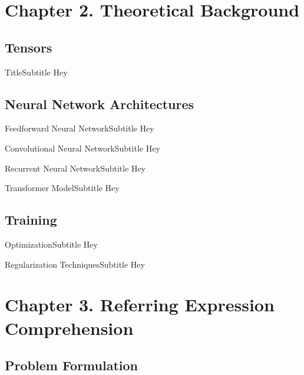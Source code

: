 \documentclass{beamer}
\begin{document}
\section{Chapter 2. Theoretical Background}

\subsection{Tensors}

\begin{frame}{Title}{Subtitle}
  Hey
\end{frame}


\subsection{Neural Network Architectures}

\begin{frame}{Feedforward Neural Network}{Subtitle}
  Hey
\end{frame}

\begin{frame}{Convolutional Neural Network}{Subtitle}
  Hey
\end{frame}

\begin{frame}{Recurrent Neural Network}{Subtitle}
  Hey
\end{frame}

\begin{frame}{Transformer Model}{Subtitle}
  Hey
\end{frame}


\subsection{Training}

\begin{frame}{Optimization}{Subtitle}
  Hey
\end{frame}

\begin{frame}{Regularization Techniques}{Subtitle}
  Hey
\end{frame}




\section{Chapter 3. Referring Expression Comprehension}

\subsection{Problem Formulation}
\end{document}

